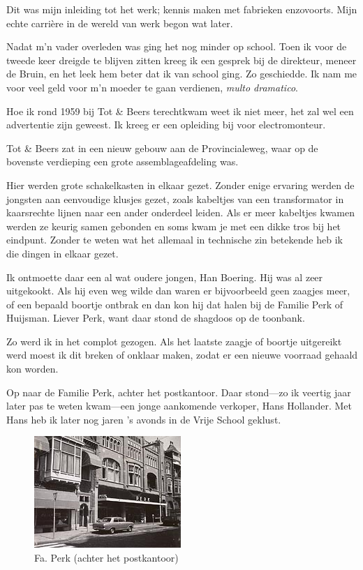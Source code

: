 \documentclass[10pt,twoside, openright]{memoir}
\begin{document}
Dit was mijn inleiding tot het werk; kennis maken met fabrieken enzovoorts. Mijn echte carrière in de wereld van werk begon wat later.

Nadat m’n vader overleden was ging het nog minder op school. Toen ik voor de tweede keer dreigde te blijven zitten kreeg ik een gesprek bij de direkteur, meneer de Bruin, en het leek hem beter dat ik van school ging. Zo geschiedde. Ik nam me voor veel geld voor m’n moeder te gaan verdienen, \emph{multo dramatico}.

Hoe ik rond 1959 bij Tot \& Beers terechtkwam weet ik niet meer, het zal wel een advertentie zijn geweest. Ik kreeg er een opleiding bij voor electromonteur.

Tot \& Beers zat in een nieuw gebouw aan de Provincialeweg, waar op de bovenste verdieping een grote assemblageafdeling was. 

Hier werden grote schakelkasten in elkaar gezet. Zonder enige ervaring werden de jongsten aan eenvoudige klusjes gezet, zoals kabeltjes van een transformator in kaarsrechte lijnen naar een ander onderdeel leiden. Als er meer kabeltjes kwamen werden ze keurig samen gebonden en soms kwam je met een dikke tros bij het eindpunt. Zonder te weten wat het allemaal in technische zin betekende heb ik die dingen in elkaar gezet. 

Ik ontmoette daar een al wat oudere jongen, Han Boering. Hij was al zeer uitgekookt. Als hij even weg wilde dan waren er bijvoorbeeld geen zaagjes meer, of een bepaald boortje ontbrak en dan kon hij dat halen bij de Familie Perk of Huijsman. Liever Perk, want daar stond de shagdoos op de toonbank. 

Zo werd ik in het complot gezogen. Als het laatste zaagje of boortje uitgereikt werd moest ik dit breken of onklaar maken, zodat er een nieuwe voorraad gehaald kon worden. 

Op naar de Familie Perk, achter het postkantoor. Daar stond---zo ik veertig jaar later pas te weten kwam---een jonge aankomende verkoper, Hans Hollander. Met Hans heb ik later nog jaren ’s avonds in de Vrije School geklust. 

\begin{figure}
\includegraphics[width=\textwidth]{img/ch32/image-2}
\caption*{\footnotesize Fa. Perk (achter het postkantoor)}
\end{figure}
\end{document}
